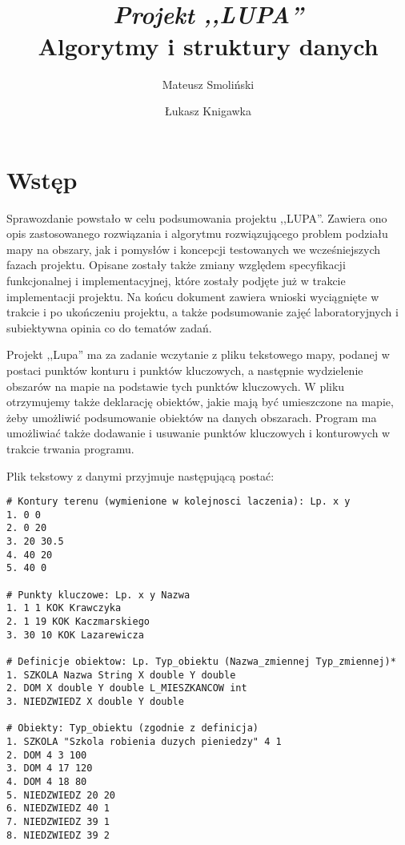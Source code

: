 \documentclass[a4paper,12pt]{article}
\title{ \sc{Sprawozdanie końcowe} \\
\emph{Projekt ,,LUPA''} \\
{Algorytmy i struktury danych}}
\author{Mateusz Smoliński \and Łukasz Knigawka}
\newcommand\tab[1][0.6cm]{\hspace*{#1}}
\begin{document}
\fancyhf{}
\rfoot{\thepage{}/\pageref{LastPage}}
\maketitle
\thispagestyle{empty}

\tableofcontents

\newpage

\section{Wstęp}

\tab Sprawozdanie powstało w celu podsumowania projektu ,,LUPA''. Zawiera ono opis zastosowanego rozwiązania i algorytmu rozwiązującego problem podziału mapy na obszary, jak i pomysłów i koncepcji testowanych we wcześniejszych fazach projektu. Opisane zostały także zmiany względem specyfikacji funkcjonalnej i implementacyjnej, które zostały podjęte już w trakcie implementacji projektu. Na końcu dokument zawiera wnioski wyciągnięte w trakcie i po ukończeniu projektu, a także podsumowanie zajęć laboratoryjnych i subiektywna opinia co do tematów zadań.

Projekt ,,Lupa'' ma za zadanie wczytanie z pliku tekstowego mapy, podanej w postaci punktów konturu i punktów kluczowych, a następnie wydzielenie obszarów na mapie na podstawie tych punktów kluczowych. W pliku otrzymujemy także deklarację obiektów, jakie mają być umieszczone na mapie, żeby umożliwić podsumowanie obiektów na danych obszarach. Program ma umożliwiać także dodawanie i usuwanie punktów kluczowych i konturowych w trakcie trwania programu.

Plik tekstowy z danymi przyjmuje następującą postać: 

\begin{lstlisting}
# Kontury terenu (wymienione w kolejnosci laczenia): Lp. x y
1. 0 0
2. 0 20
3. 20 30.5
4. 40 20
5. 40 0

# Punkty kluczowe: Lp. x y Nazwa
1. 1 1 KOK Krawczyka
2. 1 19 KOK Kaczmarskiego
3. 30 10 KOK Lazarewicza

# Definicje obiektow: Lp. Typ_obiektu (Nazwa_zmiennej Typ_zmiennej)*
1. SZKOLA Nazwa String X double Y double
2. DOM X double Y double L_MIESZKANCOW int
3. NIEDZWIEDZ X double Y double

# Obiekty: Typ_obiektu (zgodnie z definicja)
1. SZKOLA "Szkola robienia duzych pieniedzy" 4 1
2. DOM 4 3 100
3. DOM 4 17 120
4. DOM 4 18 80
5. NIEDZWIEDZ 20 20
6. NIEDZWIEDZ 40 1
7. NIEDZWIEDZ 39 1
8. NIEDZWIEDZ 39 2
\end{lstlisting}
\end{document}
